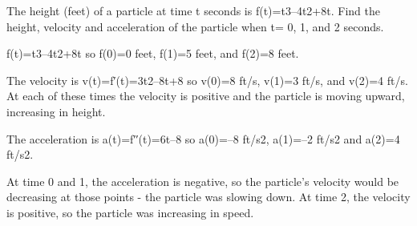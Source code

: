 \begin{example}
The height (feet) of a particle at time t seconds is f(t)=t3–4t2+8t. Find the height, velocity and acceleration of the particle when t= 0, 1, and 2 seconds.

\begin{solution} f(t)=t3–4t2+8t so f(0)=0 feet, f(1)=5 feet, and f(2)=8 feet.

The velocity is v(t)=f′(t)=3t2–8t+8 so v(0)=8 ft/s, v(1)=3 ft/s, and v(2)=4 ft/s. At each of these times the velocity is positive and the particle is moving upward, increasing in height.

The acceleration is a(t)=f′′(t)=6t–8 so a(0)=–8 ft/s2, a(1)=–2 ft/s2 and a(2)=4 ft/s2.

At time 0 and 1, the acceleration is negative, so the particle's velocity would be decreasing at those points - the particle was slowing down. At time 2, the velocity is positive, so the particle was increasing in speed.
\end{solution}\end{example}
